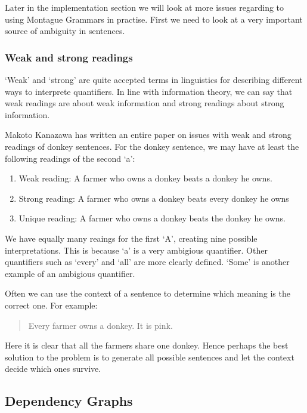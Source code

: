 \documentclass[12pt]{article}
\begin{document}
Later in the implementation section we will look at more issues regarding to using Montague Grammars in practise. First we need to look at a very important source of ambiguity in sentences.

\subsubsection{Weak and strong readings}

`Weak' and `strong' are quite accepted terms in linguistics for describing different ways to interprete quantifiers. In line with information theory, we can say that weak readings are about weak information and strong readings about strong information.

Makoto Kanazawa has written an entire paper on issues with weak and strong readings of donkey sentences\cite{kanazawa1994weak}. For the donkey sentence, we may have at least the following readings of the second `a':
\begin{enumerate}
\item Weak reading: A farmer who owns a donkey beats a donkey he owns. 
\item Strong reading: A farmer who owns a donkey beats every donkey he owns 
\item Unique reading: A farmer who owns a donkey beats the donkey he owns. 
\end{enumerate}

We have equally many reaings for the first `A', creating nine possible interpretations. This is because `a' is a very ambigious quantifier. Other quantifiers such as `every' and `all' are more clearly defined. `Some' is another example of an ambigious quantifier.

Often we can use the context of a sentence to determine which meaning is the correct one. For example:
\begin{quotation}
Every farmer owns a donkey. It is pink.
\end{quotation}
Here it is clear that all the farmers share one donkey. Hence perhaps the best solution to the problem is to generate all possible sentences and let the context decide which ones survive.

\subsection{Dependency Graphs}
\end{document}
